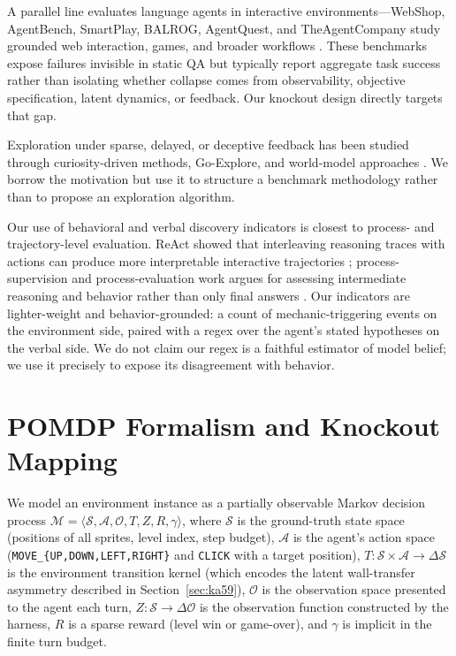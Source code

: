 \documentclass{article}
\begin{document}
A parallel line evaluates language agents in interactive environments---WebShop, AgentBench, SmartPlay, BALROG, AgentQuest, and TheAgentCompany study grounded web interaction, games, and broader workflows \citep{yao2022webshop,liu2024agentbench,wu2023smartplay,paglieri2024balrog,gioacchini2024agentquest,xu2024agentcompany}. These benchmarks expose failures invisible in static QA but typically report aggregate task success rather than isolating whether collapse comes from observability, objective specification, latent dynamics, or feedback. Our knockout design directly targets that gap.

Exploration under sparse, delayed, or deceptive feedback has been studied through curiosity-driven methods, Go-Explore, and world-model approaches \citep{pathak2017curiosity,ecoffet2019goexplore,ha2018worldmodels}. We borrow the motivation but use it to structure a benchmark methodology rather than to propose an exploration algorithm.

Our use of behavioral and verbal discovery indicators is closest to process- and trajectory-level evaluation. ReAct showed that interleaving reasoning traces with actions can produce more interpretable interactive trajectories \citep{yao2023react}; process-supervision and process-evaluation work argues for assessing intermediate reasoning and behavior rather than only final answers \citep{lightman2024verify,kuang2025enconda,gritta2026processeval}. Our indicators are lighter-weight and behavior-grounded: a count of mechanic-triggering events on the environment side, paired with a regex over the agent's stated hypotheses on the verbal side. We do not claim our regex is a faithful estimator of model belief; we use it precisely to expose its disagreement with behavior.

\section{POMDP Formalism and Knockout Mapping}
\label{sec:pomdp}
We model an environment instance as a partially observable Markov decision process $\mathcal{M} = \langle \mathcal{S}, \mathcal{A}, \mathcal{O}, T, Z, R, \gamma \rangle$, where $\mathcal{S}$ is the ground-truth state space (positions of all sprites, level index, step budget), $\mathcal{A}$ is the agent's action space (\texttt{MOVE\_\{UP,DOWN,LEFT,RIGHT\}} and \texttt{CLICK} with a target position), $T : \mathcal{S} \times \mathcal{A} \to \Delta\mathcal{S}$ is the environment transition kernel (which encodes the latent wall-transfer asymmetry described in Section~\ref{sec:ka59}), $\mathcal{O}$ is the observation space presented to the agent each turn, $Z : \mathcal{S} \to \Delta\mathcal{O}$ is the observation function constructed by the harness, $R$ is a sparse reward (level win or game-over), and $\gamma$ is implicit in the finite turn budget.
\end{document}

